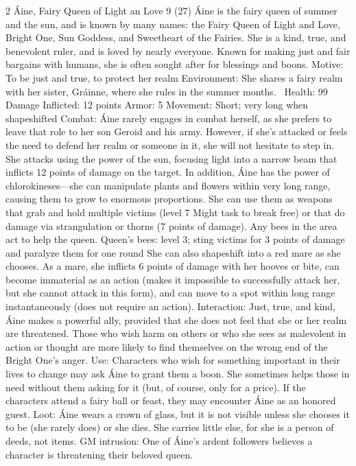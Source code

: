 \begin{multicols}{2}
Áine, Fairy Queen of Light an Love 9 (27)
Áine is the fairy queen of summer and the sun, and is known by many names: the Fairy Queen of Light and Love, Bright One, Sun Goddess, and Sweetheart of the Fairies. She is a kind, true, and benevolent ruler, and is loved by nearly everyone. Known for making just and fair bargains with humans, she is often sought after for blessings and boons.
Motive: To be just and true, to protect her realm
Environment: She shares a fairy realm with her sister, Gráinne, where she rules in the summer months. 
Health: 99
Damage Inflicted: 12 points
Armor: 5
Movement: Short; very long when shapeshifted
Combat: Áine rarely engages in combat herself, as she prefers to leave that role to her son
Geroid and his army. However, if she’s attacked or feels the need to defend her realm or someone in it, she will not hesitate to step in. She attacks using the power of the sun, focusing light into a narrow beam that inflicts 12 points of damage on the target.
In addition, Áine has the power of chlorokineses—she can manipulate plants and flowers within very long range, causing them to grow to enormous proportions. She can use them as weapons that grab and hold multiple victims (level 7 Might task to break free) or that do damage via strangulation or thorns (7 points of damage). Any bees in the area act to help the queen.
Queen’s bees: level 3; sting victims for 3 points of damage and paralyze
them for one round
She can also shapeshift into a red mare as she chooses. As a mare, she inflicts 6 points of damage with her hooves or bite, can become immaterial as an action (makes it impossible to successfully attack her, but she cannot attack in this form), and can move to a spot within long range instantaneously (does not require an action).
Interaction: Just, true, and kind, Áine makes a powerful ally, provided that she does not feel that she or her realm are threatened. Those who wish harm on others or who she sees as malevolent in action or thought are more likely to
find themselves on the wrong end of the Bright One’s anger.
Use: Characters who wish for something important in their lives to change may ask Áine to grant them a boon. She sometimes helps those in need without them asking for it (but, of course, only for a price). If the characters attend a fairy ball or feast, they may encounter Áine as an honored guest.
Loot: Áine wears a crown of glass, but it is not visible unless she chooses it to be (she rarely does) or she dies. She carries little else, for she is a person of deeds, not items.
GM intrusion: One of Áine’s ardent followers believes a character is threatening their beloved queen.


\end{multicols}
